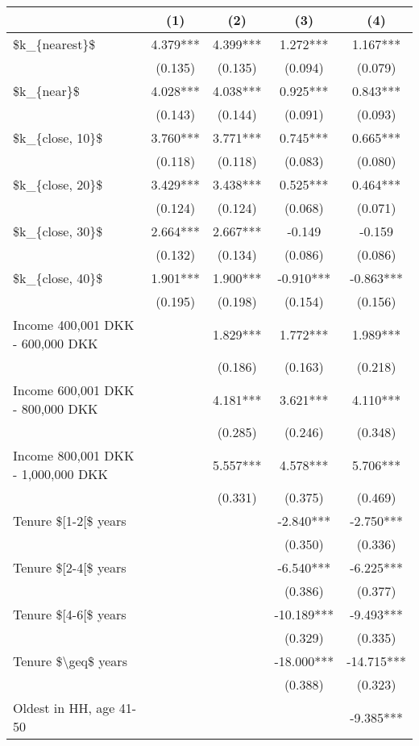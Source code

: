 \setlength{\LTpost}{0mm}
\begin{longtable}{lcccc}
\toprule
  & (1) & (2) & (3) & (4) \\ 
\midrule
\$k\_\{nearest\}\$ & 4.379*** & 4.399*** & 1.272*** & 1.167*** \\ 
 & (0.135) & (0.135) & (0.094) & (0.079) \\ 
\$k\_\{near\}\$ & 4.028*** & 4.038*** & 0.925*** & 0.843*** \\ 
 & (0.143) & (0.144) & (0.091) & (0.093) \\ 
\$k\_\{close, 10\}\$ & 3.760*** & 3.771*** & 0.745*** & 0.665*** \\ 
 & (0.118) & (0.118) & (0.083) & (0.080) \\ 
\$k\_\{close, 20\}\$ & 3.429*** & 3.438*** & 0.525*** & 0.464*** \\ 
 & (0.124) & (0.124) & (0.068) & (0.071) \\ 
\$k\_\{close, 30\}\$ & 2.664*** & 2.667*** & -0.149 & -0.159 \\ 
 & (0.132) & (0.134) & (0.086) & (0.086) \\ 
\$k\_\{close, 40\}\$ & 1.901*** & 1.900*** & -0.910*** & -0.863*** \\ 
 & (0.195) & (0.198) & (0.154) & (0.156) \\ 
Income 400,001 DKK - 600,000 DKK &  & 1.829*** & 1.772*** & 1.989*** \\ 
 &  & (0.186) & (0.163) & (0.218) \\ 
Income 600,001 DKK - 800,000 DKK &  & 4.181*** & 3.621*** & 4.110*** \\ 
 &  & (0.285) & (0.246) & (0.348) \\ 
Income 800,001 DKK - 1,000,000 DKK &  & 5.557*** & 4.578*** & 5.706*** \\ 
 &  & (0.331) & (0.375) & (0.469) \\ 
Tenure \$[1-2[\$ years &  &  & -2.840*** & -2.750*** \\ 
 &  &  & (0.350) & (0.336) \\ 
Tenure \$[2-4[\$ years &  &  & -6.540*** & -6.225*** \\ 
 &  &  & (0.386) & (0.377) \\ 
Tenure \$[4-6[\$ years &  &  & -10.189*** & -9.493*** \\ 
 &  &  & (0.329) & (0.335) \\ 
Tenure \$\textbackslash{}geq\$ years &  &  & -18.000*** & -14.715*** \\ 
 &  &  & (0.388) & (0.323) \\ 
Oldest in HH, age 41-50 &  &  &  & -9.385*** \\ 

\end{longtable}
